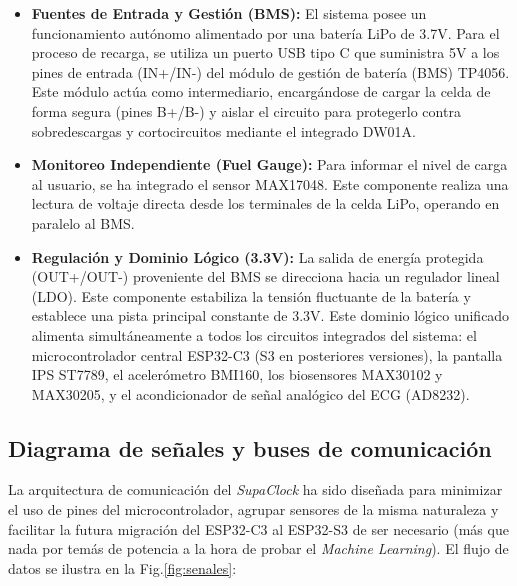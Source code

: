 \documentclass[letterpaper,11pt]{article}
\newcommand{\rfigura}[1]{Fig.\ref{#1}}
\begin{document}
\begin{itemize}
    \item \textbf{Fuentes de Entrada y Gestión (BMS):} El sistema posee un funcionamiento autónomo alimentado por una batería LiPo de 3.7V. Para el proceso de recarga, se utiliza un puerto USB tipo C que suministra 5V a los pines de entrada (IN+/IN-) del módulo de gestión de batería (BMS) TP4056. Este módulo actúa como intermediario, encargándose de cargar la celda de forma segura (pines B+/B-) y aislar el circuito para protegerlo contra sobredescargas y cortocircuitos mediante el integrado DW01A.
    \item \textbf{Monitoreo Independiente (Fuel Gauge):} Para informar el nivel de carga al usuario, se ha integrado el sensor MAX17048. Este componente realiza una lectura de voltaje directa desde los terminales de la celda LiPo, operando en paralelo al BMS.
    \item \textbf{Regulación y Dominio Lógico (3.3V):} La salida de energía protegida (OUT+/OUT-) proveniente del BMS se direcciona hacia un regulador lineal (LDO). Este componente estabiliza la tensión fluctuante de la batería y establece una pista principal constante de 3.3V. Este dominio lógico unificado alimenta simultáneamente a todos los circuitos integrados del sistema: el microcontrolador central ESP32-C3 (S3 en posteriores versiones), la pantalla IPS ST7789, el acelerómetro BMI160, los biosensores MAX30102 y MAX30205, y el acondicionador de señal analógico del ECG (AD8232).
\end{itemize}
\subsection{Diagrama de señales y buses de comunicación}

La arquitectura de comunicación del \textit{SupaClock} ha sido diseñada para minimizar el uso de pines del microcontrolador, agrupar sensores de la misma naturaleza y facilitar la futura migración del ESP32-C3 al ESP32-S3 de ser necesario (más que nada por temás de potencia a la hora de probar el \textit{Machine Learning}). El flujo de datos se ilustra en la \rfigura{fig:senales}:
\end{document}
